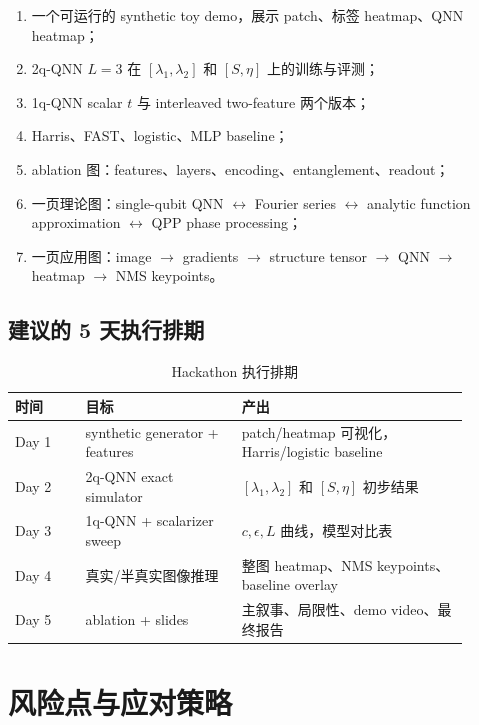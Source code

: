 \documentclass[UTF8,zihao=-4]{ctexart}
\begin{document}
\begin{enumerate}[leftmargin=2.0em]
    \item 一个可运行的 synthetic toy demo，展示 patch、标签 heatmap、QNN heatmap；
    \item 2q-QNN $L=3$ 在 $[\lambda_1,\lambda_2]$ 和 $[S,\eta]$ 上的训练与评测；
    \item 1q-QNN scalar $t$ 与 interleaved two-feature 两个版本；
    \item Harris、FAST、logistic、MLP baseline；
    \item ablation 图：features、layers、encoding、entanglement、readout；
    \item 一页理论图：single-qubit QNN $\leftrightarrow$ Fourier series $\leftrightarrow$ analytic function approximation $\leftrightarrow$ QPP phase processing；
    \item 一页应用图：image $\rightarrow$ gradients $\rightarrow$ structure tensor $\rightarrow$ QNN $\rightarrow$ heatmap $\rightarrow$ NMS keypoints。
\end{enumerate}

\subsection{建议的 5 天执行排期}

\begin{table}[H]
\centering
\caption{Hackathon 执行排期}
\begin{tabular}{p{0.14\linewidth}p{0.31\linewidth}p{0.45\linewidth}}
\toprule
时间 & 目标 & 产出 \\
\midrule
Day 1 & synthetic generator + features & patch/heatmap 可视化，Harris/logistic baseline \\
Day 2 & 2q-QNN exact simulator & $[\lambda_1,\lambda_2]$ 和 $[S,\eta]$ 初步结果 \\
Day 3 & 1q-QNN + scalarizer sweep & $c,\epsilon,L$ 曲线，模型对比表 \\
Day 4 & 真实/半真实图像推理 & 整图 heatmap、NMS keypoints、baseline overlay \\
Day 5 & ablation + slides & 主叙事、局限性、demo video、最终报告 \\
\bottomrule
\end{tabular}
\end{table}

\section{风险点与应对策略}
\end{document}
